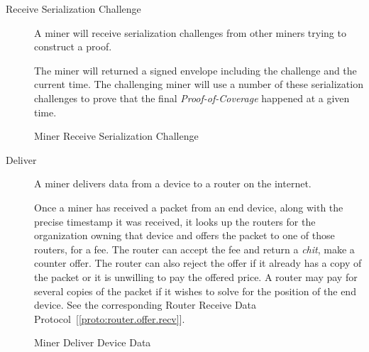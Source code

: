 \documentclass[letterpaper,11pt]{article}
\begin{document}
\begin{description}
  \item [Receive Serialization Challenge] A miner will receive serialization challenges from other miners trying to construct a proof.

    The miner will returned a signed envelope including the challenge and the current time. The challenging miner will use a number of these serialization challenges to prove that the final \emph{Proof-of-Coverage} happened at a given time.

    \begin{algorithm}[!htb]
      \DontPrintSemicolon
      \caption{Miner Receive Serialization Challenge}\label{proto:miner.recv.challenge.serialization}

    \end{algorithm}
    \FloatBarrier

  \item [Deliver] A miner delivers data from a device to a router on the internet.

    Once a miner has received a packet from an end device, along with the precise timestamp it was received, it looks up the routers for the organization owning that device and offers the packet to one of those routers, for a fee. The router can accept the fee and return a \emph{chit}, make a counter offer. The router can also reject the offer if it already has a copy of the packet or it is unwilling to pay the offered price. A router may pay for several copies of the packet if it wishes to solve for the position of the end device. See the corresponding Router Receive Data Protocol~[\ref{proto:router.offer.recv}].

    \begin{algorithm}[!htb]
      \DontPrintSemicolon
      \caption{Miner Deliver Device Data}\label{proto:miner.data.deliver}


\end{algorithm}
\end{description}
\end{document}
